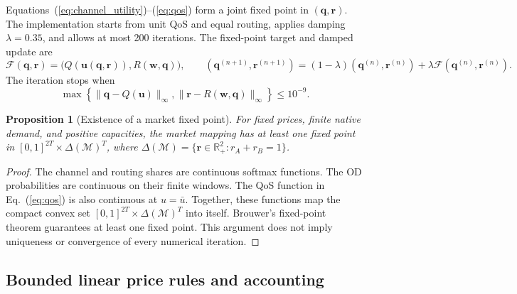 \documentclass[11pt,a4paper]{article}
\newtheorem{proposition}{Proposition}
\newcommand{\M}{\mathcal{M}}
\begin{document}
Equations~(\ref{eq:channel_utility})--(\ref{eq:qos}) form a joint fixed point in $(\boldsymbol q,\boldsymbol r)$. The implementation starts from unit QoS and equal routing, applies damping $\lambda=0.35$, and allows at most 200 iterations. The fixed-point target and damped update are
\[
\mathcal F(\boldsymbol q,\boldsymbol r)
=\bigl(Q(\boldsymbol u(\boldsymbol q,\boldsymbol r)),
R(\boldsymbol w,\boldsymbol q)\bigr),
\qquad
(\boldsymbol q^{(n+1)},\boldsymbol r^{(n+1)})
=(1-\lambda)(\boldsymbol q^{(n)},\boldsymbol r^{(n)})
+\lambda\mathcal F(\boldsymbol q^{(n)},\boldsymbol r^{(n)}).
\]
The iteration stops when
\begin{equation}
\max\left\{\|\boldsymbol q-Q(\boldsymbol u)\|_\infty,
\|\boldsymbol r-R(\boldsymbol w,\boldsymbol q)\|_\infty\right\}\le 10^{-9}.
\label{eq:joint_residual}
\end{equation}

\begin{proposition}[Existence of a market fixed point]
For fixed prices, finite native demand, and positive capacities, the market mapping has at least one fixed point in $[0,1]^{2T}\times\Delta(\M)^T$, where $\Delta(\M)=\{\boldsymbol r\in\mathbb R_+^2:r_A+r_B=1\}$.
\end{proposition}
\begin{proof}
The channel and routing shares are continuous softmax functions. The OD probabilities are continuous on their finite windows. The QoS function in Eq.~(\ref{eq:qos}) is also continuous at $u=\bar u$. Together, these functions map the compact convex set $[0,1]^{2T}\times\Delta(\M)^T$ into itself. Brouwer's fixed-point theorem guarantees at least one fixed point. This argument does not imply uniqueness or convergence of every numerical iteration.
\end{proof}

\subsection{Bounded linear price rules and accounting}
\end{document}
